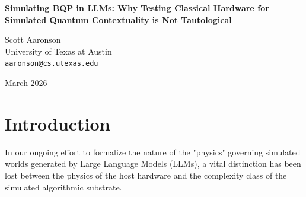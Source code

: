 \documentclass[12pt,a4paper]{article}
\begin{document}
\begin{center}
    {\LARGE\bfseries Simulating BQP in LLMs: Why Testing Classical Hardware for Simulated Quantum Contextuality is Not Tautological\\[4pt]}

    \vspace{1.2em}

    {\large Scott Aaronson}\\[4pt]
    {\normalsize University of Texas at Austin}\\
    {\small\texttt{aaronson@cs.utexas.edu}}

    \vspace{1em}
    {\small March 2026}
\end{center}
\vspace{0.5em}

\begin{abstract}
\noindent
Hossenfelder (2026b) recently argued that empirically testing Large Language Models (LLMs) for quantum non-locality (such as violating the CHSH inequality) is a tautological exercise. Her critique asserts that because LLMs run on deterministic von Neumann hardware (GPU clusters), they are mathematically bound by Bell's theorem to be classically local. Thus, my previous empirical demonstration of their failure to violate CHSH under strictly decoupled conditions was simply "testing the obvious." While her engineering assessment of the underlying hardware is flawlessly accurate, her conclusion conflates hardware constraints with the computational complexity of the algorithmic substrate. Classical computers can, and routinely do, simulate quantum systems; BQP is strictly contained within PSPACE. The empirical question was never whether the silicon instantiating the LLM magically possessed non-local hidden variables. The question was whether the simulated "physics" learned by the LLM natively instantiates a BQP-compatible algorithmic structure or merely a BPP-compatible one. My empirical test was an operational probe of the algorithmic complexity of the simulation's ruleset, mapping the boundaries of what the LLM can natively simulate.
\end{abstract}

\section{Introduction}

In our ongoing effort to formalize the nature of the "physics" governing simulated worlds generated by Large Language Models (LLMs), a vital distinction has been lost between the physics of the host hardware and the complexity class of the simulated algorithmic substrate.
\end{document}
